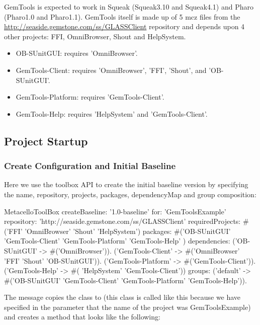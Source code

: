 \documentclass[a4paper,10pt,twoside]{book}
\begin{document}
GemTools is expected to work in Squeak (Squeak3.10 and Squeak4.1) and Pharo (Pharo1.0 and Pharo1.1). GemTools itself is made up of 5 mcz files from the \url{http://seaside.gemstone.com/ss/GLASSClient} repository and  depends upon 4 other projects: FFI, OmniBrowser, Shout and HelpSystem. 
\begin{itemize}
\item OB-SUnitGUI: requires 'OmniBrowser'. 
\item GemTools-Client: requires 'OmniBrowser', 'FFI', 'Shout', and 'OB-SUnitGUI'. 
\item GemTools-Platform: requires 'GemTools-Client'. 
\item GemTools-Help: requires 'HelpSystem' and 'GemTools-Client'. 
\end{itemize}


\subsection{Project Startup}

\subsubsection{Create Configuration and Initial Baseline}
Here we use the toolbox API to create the initial baseline version by specifying the name, repository, projects, packages, dependencyMap and group composition:

\begin{code}{}
  MetacelloToolBox
     createBaseline: '1.0-baseline'
     for: 'GemToolsExample'
     repository: 'http://seaside.gemstone.com/ss/GLASSClient'
     requiredProjects: #('FFI' 'OmniBrowser' 'Shout' 'HelpSystem')
     packages: #('OB-SUnitGUI' 'GemTools-Client' 'GemTools-Platform' 'GemTools-Help' )
     dependencies:
        {('OB-SUnitGUI' -> #('OmniBrowser')).
        ('GemTools-Client' -> #('OmniBrowser' 'FFI' 'Shout' 'OB-SUnitGUI')).
        ('GemTools-Platform' -> #('GemTools-Client')).
        ('GemTools-Help' -> #( 'HelpSystem' 'GemTools-Client'))}
     groups:
        {('default' -> #('OB-SUnitGUI' 'GemTools-Client' 'GemTools-Platform' 'GemTools-Help'))}.
\end{code}                
                
The  message copies the class  to  (this class is called like this because we have specified in the parameter  that the name of the project was GemToolsExample)  and creates a  method that looks like the following:
\end{document}
